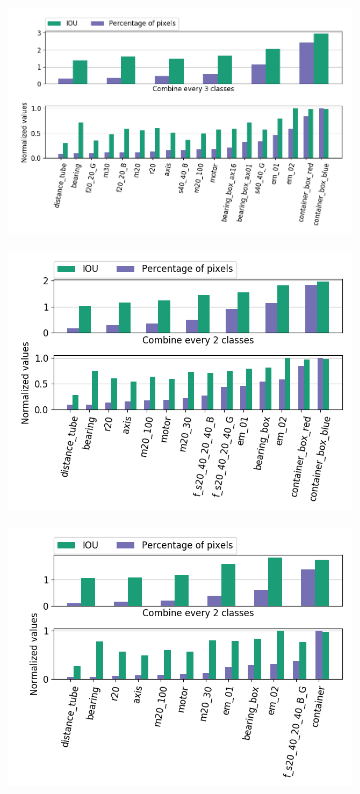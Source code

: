 	\begin{figure}[!htb]
		\begin{subfigure}{1\textwidth}
			\centering
			\includegraphics[width=1\linewidth]{images/cls_iou_full}
		\end{subfigure}
		\begin{subfigure}{.5\textwidth}
			\centering
			\includegraphics[width=1\linewidth]{images/cls_iou_size}
		\end{subfigure}
		\begin{subfigure}{.5\textwidth}
			\centering
			\includegraphics[width=1\linewidth]{images/cls_iou_shape}

\end{subfigure}
\end{figure}
